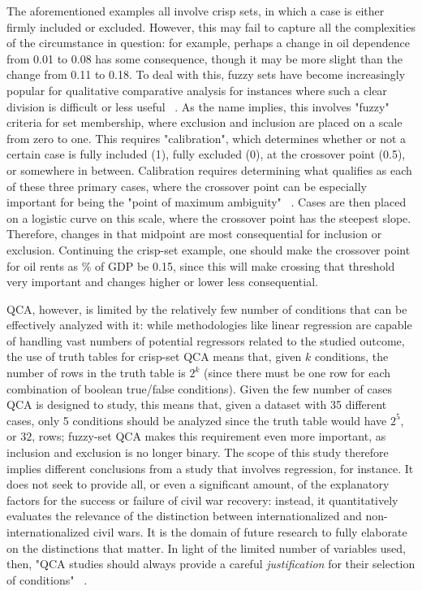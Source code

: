 \documentclass{article}
\begin{document}
The aforementioned examples all involve crisp sets, in which a case is either firmly included or excluded. However, this may fail to capture all the complexities of the circumstance in question: for example, perhaps a change in oil dependence from 0.01 to 0.08 has some consequence, though it may be more slight than the change from 0.11 to 0.18. To deal with this, fuzzy sets have become increasingly popular for qualitative comparative analysis for instances where such a clear division is difficult or less useful ~\cite{mello}. As the name implies, this involves "fuzzy" criteria for set membership, where exclusion and inclusion are placed on a scale from zero to one. This requires "calibration", which determines whether or not a certain case is fully included (1), fully excluded (0), at the crossover point (0.5), or somewhere in between. Calibration requires determining what qualifies as each of these three primary cases, where the crossover point can be especially important for being the "point of maximum ambiguity" ~\cite{ragin}. Cases are then placed on a logistic curve on this scale, where the crossover point has the steepest slope. Therefore, changes in that midpoint are most consequential for inclusion or exclusion. Continuing the crisp-set example, one should make the crossover point for oil rents as \% of GDP be 0.15, since this will make crossing that threshold very important and changes higher or lower less consequential. 

QCA, however, is limited by the relatively few number of conditions that can be effectively analyzed with it: while methodologies like linear regression are capable of handling vast numbers of potential regressors related to the studied outcome, the use of truth tables for crisp-set QCA means that, given $k$ conditions, the number of rows in the truth table is $2^k$ (since there must be one row for each combination of boolean true/false conditions). Given the few number of cases QCA is designed to study, this means that, given a dataset with 35 different cases, only 5 conditions should be analyzed since the truth table would have $2^5$, or $32$, rows; fuzzy-set QCA makes this requirement even more important, as inclusion and exclusion is no longer binary. The scope of this study therefore implies different conclusions from a study that involves regression, for instance. It does not seek to provide all, or even a significant amount, of the explanatory factors for the success or failure of civil war recovery: instead, it quantitatively evaluates the relevance of the distinction between internationalized and non-internationalized civil wars. It is the domain of future research to fully elaborate on the distinctions that matter. In light of the limited number of variables used, then, "QCA studies should always provide a careful \textit{justification} for their selection of conditions" ~\cite{mello}.
\end{document}
